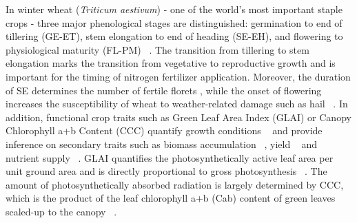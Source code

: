 In winter wheat (\textsl{Triticum aestivum}) - one of the world's most important staple crops - three major phenological stages are distinguished: germination to end of tillering (GE-ET), stem elongation to end of heading (SE-EH), and flowering to physiological maturity (FL-PM) ~\citep{hay_convergence_1991}. The transition from tillering to stem elongation marks the transition from vegetative to reproductive growth and is important for the timing of nitrogen fertilizer application. Moreover, the duration of SE determines the number of fertile florets \citep{gonzalez_grain_2003}, while the onset of flowering increases the susceptibility of wheat to weather-related damage such as hail ~\citep{holman_impact_2022}. In addition, functional crop traits such as Green Leaf Area Index (GLAI) or Canopy Chlorophyll a+b Content (CCC) quantify growth conditions ~\citep{gitelson_relationships_2014} and provide inference on secondary traits such as biomass accumulation ~\citep{gitelson_remote_2003}, yield ~\citep{huang_improving_2015,chen_improving_2018,hashimoto_feasibility_2022} and nutrient supply ~\citep{delloye_retrieval_2018}. GLAI quantifies the photosynthetically active leaf area per unit ground area and is directly proportional to gross photosynthesis ~\citep{gitelson_remote_2003}. The amount of photosynthetically absorbed radiation is largely determined by CCC, which is the product of the leaf chlorophyll a+b (Cab) content of green leaves scaled-up to the canopy ~\citep{gitelson_relationships_2014}.

